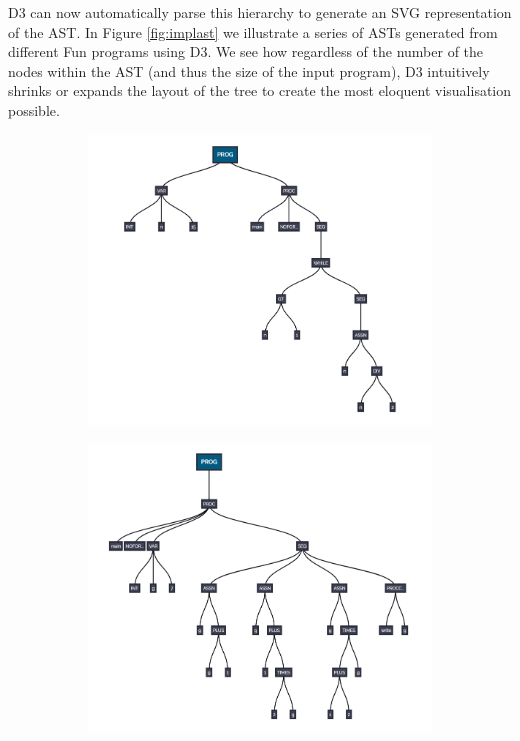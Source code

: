 \documentclass{l4proj}
\begin{document}
D3 can now automatically parse this hierarchy to generate an SVG representation of the AST. In Figure \ref{fig:implast} we illustrate a series of ASTs generated from different Fun programs using D3. We see how regardless of the number of the nodes within the AST (and thus the size of the input program), D3 intuitively shrinks or expands the layout of the tree to create the most eloquent visualisation possible.
\begin{figure}[h]
	\centering
	\begin{subfigure}[b]{.33\textwidth}
		\centering
		\includegraphics[width=.8\linewidth]{images/implast.PNG}
	\end{subfigure}%
	\begin{subfigure}[b]{.33\textwidth}
		\centering
		\includegraphics[width=.8\linewidth]{images/implast2.PNG}
	\end{subfigure}%
	\begin{subfigure}[b]{.33\textwidth}

\end{subfigure}
\end{figure}
\end{document}
